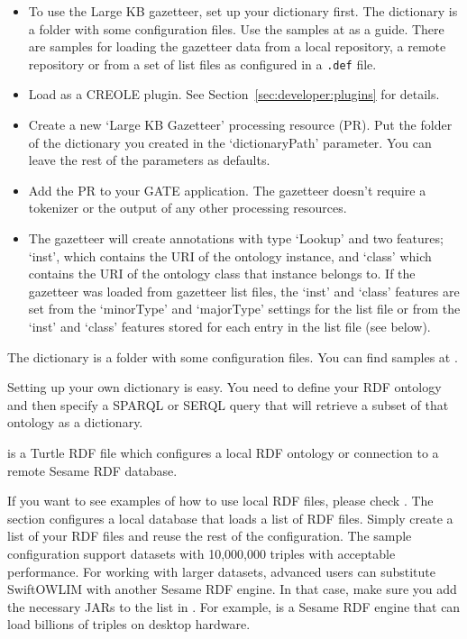 \begin{itemize}
\item{} To use the Large KB gazetteer, set up your dictionary first. The
dictionary is a folder with some configuration files. Use the samples at
 as a guide. There are 
samples for loading the gazetteer data from a local repository, a remote
repository or from a set of list files as configured in a \texttt{.def} file.

\item{} Load  as a CREOLE plugin.
See Section~\ref{sec:developer:plugins} for details.

\item{} Create a new `Large KB Gazetteer' processing resource (PR). Put the
folder of the dictionary you created in the `dictionaryPath' parameter. You can
leave the rest of the parameters as defaults.

\item{} Add the PR to your GATE application. The gazetteer doesn't require a
tokenizer or the output of any other processing resources.

\item{} The gazetteer will create annotations with type `Lookup' and two
features; `inst', which contains the URI of the ontology instance, and `class'
which contains the URI of the ontology class that instance belongs to. If
the gazetteer was loaded from gazetteer list files, the `inst' and `class'
features are set from the `minorType' and `majorType' settings for the list
file or from the `inst' and `class' features stored for each entry in
the list file (see below).
\end{itemize}


The dictionary is a folder with some configuration files. You can find samples at
.

Setting up your own dictionary is easy. You need to define your RDF ontology
and then specify a SPARQL or SERQL query that will retrieve a subset of that
ontology as a dictionary.

 is a Turtle RDF file which configures a local RDF
ontology or connection to a remote Sesame RDF database.

If you want to see examples of how to use local RDF files, please check
. The
 section configures a local
 database that loads a
list of RDF files. Simply create a list of your RDF files and reuse the rest of
the configuration. The sample configuration support datasets with 10,000,000
triples with acceptable performance. For working with larger datasets, advanced
users can substitute SwiftOWLIM with another Sesame RDF engine. In that case,
make sure you add the necessary JARs to the list in
. For example,
 is a Sesame RDF
engine that can load billions of triples on desktop hardware.


